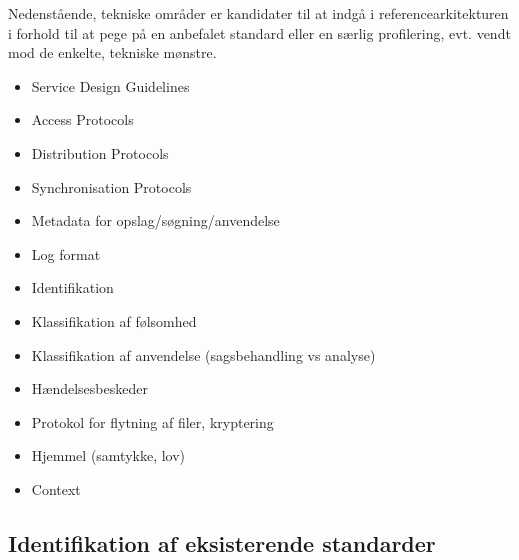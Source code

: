 Nedenstående, tekniske områder er kandidater til at indgå i
referencearkitekturen i forhold til at pege på en anbefalet standard
eller en særlig profilering, evt. vendt mod de enkelte, tekniske
mønstre.

\begin{itemize}
\item
  Service Design Guidelines
\item
  Access Protocols
\item
  Distribution Protocols
\item
  Synchronisation Protocols
\item
  Metadata for opslag/søgning/anvendelse
\item
  Log format
\item
  Identifikation
\item
  Klassifikation af følsomhed
\item
  Klassifikation af anvendelse (sagsbehandling vs analyse)
\item
  Hændelsesbeskeder
\item
  Protokol for flytning af filer, kryptering
\item
  Hjemmel (samtykke, lov)
\item
  Context
\end{itemize}

\subsection{Identifikation af eksisterende
standarder}\label{identifikation-af-eksisterende-standarder}
